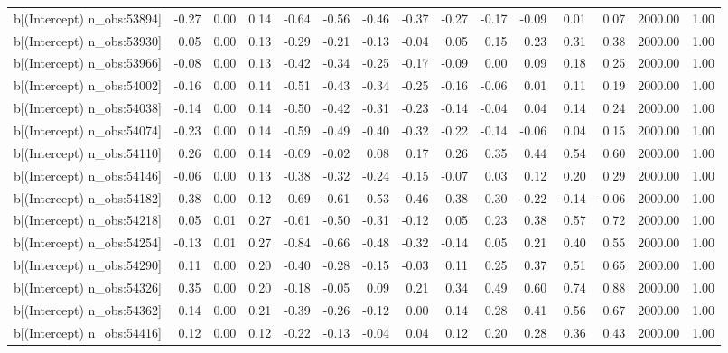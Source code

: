 \begin{table}[ht]
\begin{tabular}{rrrrrrrrrrrrrrr}
  b[(Intercept) n\_obs:53894] & -0.27 & 0.00 & 0.14 & -0.64 & -0.56 & -0.46 & -0.37 & -0.27 & -0.17 & -0.09 & 0.01 & 0.07 & 2000.00 & 1.00 \\ 
  b[(Intercept) n\_obs:53930] & 0.05 & 0.00 & 0.13 & -0.29 & -0.21 & -0.13 & -0.04 & 0.05 & 0.15 & 0.23 & 0.31 & 0.38 & 2000.00 & 1.00 \\ 
  b[(Intercept) n\_obs:53966] & -0.08 & 0.00 & 0.13 & -0.42 & -0.34 & -0.25 & -0.17 & -0.09 & 0.00 & 0.09 & 0.18 & 0.25 & 2000.00 & 1.00 \\ 
  b[(Intercept) n\_obs:54002] & -0.16 & 0.00 & 0.14 & -0.51 & -0.43 & -0.34 & -0.25 & -0.16 & -0.06 & 0.01 & 0.11 & 0.19 & 2000.00 & 1.00 \\ 
  b[(Intercept) n\_obs:54038] & -0.14 & 0.00 & 0.14 & -0.50 & -0.42 & -0.31 & -0.23 & -0.14 & -0.04 & 0.04 & 0.14 & 0.24 & 2000.00 & 1.00 \\ 
  b[(Intercept) n\_obs:54074] & -0.23 & 0.00 & 0.14 & -0.59 & -0.49 & -0.40 & -0.32 & -0.22 & -0.14 & -0.06 & 0.04 & 0.15 & 2000.00 & 1.00 \\ 
  b[(Intercept) n\_obs:54110] & 0.26 & 0.00 & 0.14 & -0.09 & -0.02 & 0.08 & 0.17 & 0.26 & 0.35 & 0.44 & 0.54 & 0.60 & 2000.00 & 1.00 \\ 
  b[(Intercept) n\_obs:54146] & -0.06 & 0.00 & 0.13 & -0.38 & -0.32 & -0.24 & -0.15 & -0.07 & 0.03 & 0.12 & 0.20 & 0.29 & 2000.00 & 1.00 \\ 
  b[(Intercept) n\_obs:54182] & -0.38 & 0.00 & 0.12 & -0.69 & -0.61 & -0.53 & -0.46 & -0.38 & -0.30 & -0.22 & -0.14 & -0.06 & 2000.00 & 1.00 \\ 
  b[(Intercept) n\_obs:54218] & 0.05 & 0.01 & 0.27 & -0.61 & -0.50 & -0.31 & -0.12 & 0.05 & 0.23 & 0.38 & 0.57 & 0.72 & 2000.00 & 1.00 \\ 
  b[(Intercept) n\_obs:54254] & -0.13 & 0.01 & 0.27 & -0.84 & -0.66 & -0.48 & -0.32 & -0.14 & 0.05 & 0.21 & 0.40 & 0.55 & 2000.00 & 1.00 \\ 
  b[(Intercept) n\_obs:54290] & 0.11 & 0.00 & 0.20 & -0.40 & -0.28 & -0.15 & -0.03 & 0.11 & 0.25 & 0.37 & 0.51 & 0.65 & 2000.00 & 1.00 \\ 
  b[(Intercept) n\_obs:54326] & 0.35 & 0.00 & 0.20 & -0.18 & -0.05 & 0.09 & 0.21 & 0.34 & 0.49 & 0.60 & 0.74 & 0.88 & 2000.00 & 1.00 \\ 
  b[(Intercept) n\_obs:54362] & 0.14 & 0.00 & 0.21 & -0.39 & -0.26 & -0.12 & 0.00 & 0.14 & 0.28 & 0.41 & 0.56 & 0.67 & 2000.00 & 1.00 \\ 
  b[(Intercept) n\_obs:54416] & 0.12 & 0.00 & 0.12 & -0.22 & -0.13 & -0.04 & 0.04 & 0.12 & 0.20 & 0.28 & 0.36 & 0.43 & 2000.00 & 1.00 \\ 

\end{tabular}
\end{table}
